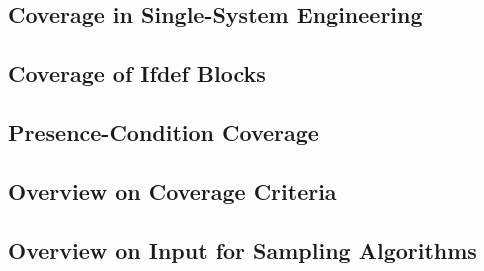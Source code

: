 \subsection{Coverage in Single-System Engineering}

\subsection{Coverage of Ifdef Blocks}

\subsection{Presence-Condition Coverage}


\subsection{Overview on Coverage Criteria}

\subsection{Overview on Input for Sampling Algorithms}

%

\lessonslearned{
	\item \ldots
}{
	\item \ldots
}{
	\ldots
}





